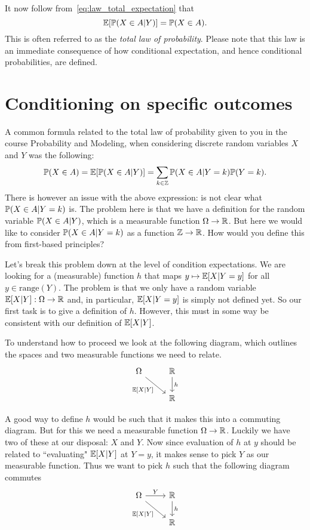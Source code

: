 It now follow from~\eqref{eq:law_total_expectation} that
\[
	\mathbb E[\mathbb P(X \in A | Y)] = \mathbb P(X \in A).
\]
This is often referred to as the \emph{total law of probability}. Please note that this law is an immediate consequence of how conditional expectation, and hence conditional probabilities, are defined.



\section{Conditioning on specific outcomes}

A common formula related to the total law of probability given to you in the course Probability and Modeling, when considering discrete random variables $X$ and $Y$ was the following:
\begin{equation}\label{eq:law_of_probability_discrete}
	\mathbb P(X \in A) = \mathbb E[\mathbb P(X \in A | Y)] = \sum_{k \in \mathbb Z} \mathbb P(X \in A | Y= k) \mathbb P(Y = k). 
\end{equation}
There is however an issue with the above expression: is not clear what $\mathbb P(X \in A | Y = k)$ is. The problem here is that we have a definition for the random variable $\mathbb P(X \in A | Y)$, which is a measurable function $\Omega \to \mathbb R$. But here we would like to consider $\mathbb P(X \in A | Y = k)$ as a function $\mathbb Z \to \mathbb R$. How would you define this from first-based principles?

Let's break this problem down at the level of condition expectations. We are looking for a (measurable) function $h$ that maps $y \mapsto \mathbb E[X | Y = y]$ for all $y \in \mathrm{range}(Y)$. The problem is that we only have a random variable $\mathbb E[X |Y] : \Omega \to \mathbb R$ and, in particular, $\mathbb E[X | Y = y]$ is simply not defined yet. So our first task is to give a definition of $h$. However, this must in some way be consistent with our definition of $\mathbb E[X|Y]$.  

To understand how to proceed we look at the following diagram, which outlines the spaces and two measurable functions we need to relate.
\[
\begin{tikzcd}
	\Omega \arrow[dr,swap,"{\bbE[X|Y]}"] &\bbR \arrow[d,"h"]  \\
	&\bbR
\end{tikzcd}
\]

A good way to define $h$ would be such that it makes this into a commuting diagram. But for this we need a measurable function $\Omega \to \mathbb R$. Luckily we have two of these at our disposal: $X$ and $Y$. Now since evaluation of $h$ at $y$ should be related to ``evaluating" $\mathbb E[X|Y]$ at $Y = y$, it makes sense to pick $Y$ as our measurable function. Thus we want to pick $h$ such that the following diagram commutes
\[
\begin{tikzcd}
	\Omega \arrow[r,"Y"] \arrow[dr,swap,"{\bbE[X|Y]}"] &\bbR \arrow[d,"h"]  \\
	&\bbR
\end{tikzcd}
\]

